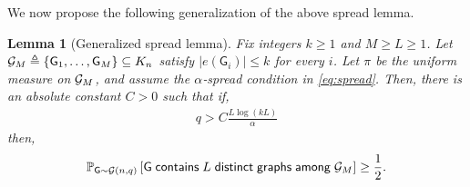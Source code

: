 \documentclass[12pt]{article}
\newtheorem{lemma}{Lemma}
\def\P{{\mathbb P}}
\newcommand{\calG}{{\cal G}}
\newcommand{\pp}[1]{\left[#1\right]}
\newcommand{\ppp}[1]{\left\{#1\right\}}
\newcommand{\s}[1]{\mathsf{#1}}
\begin{document}
We now propose the following generalization of the above spread lemma.
\begin{lemma}[Generalized spread lemma]
\label{lem:Gspread}
Fix integers $k\geq  1$ and $M\geq  L\geq  1$.  
Let $\calG_M\triangleq\ppp{\s{G}_{1},\dots ,\s{G}_{M}}\subseteq K_{n}$ satisfy $|e(\s{G}_{i})|\leq  k$ for every $i$. Let $\pi$ be the uniform measure on $\calG_M$, and assume the
\emph{$\alpha$‑spread} condition in \eqref{eq:spread}. Then, there is an absolute constant $C>0$ such that if,
\begin{align}
  q>C\frac{L\log(kL)}{\alpha}
  \label{eq:threshold}
\end{align}
then,
\begin{align}
  \P_{\s{G}\sim \calG(n,q)}\pp{\s{G}\;
    \s{contains}\; L\; \s{distinct}\; \s{graphs}\;\s{among}\;
    \calG_M}\geq\frac{1}{2}.
\end{align}
\end{lemma}
\end{document}
